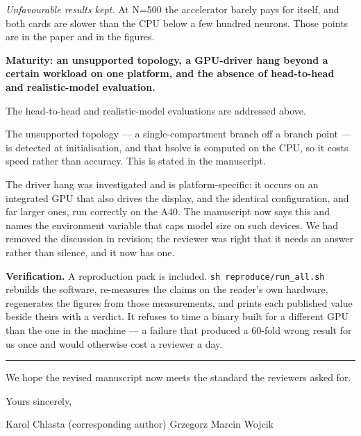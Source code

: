 \documentclass[11pt,a4paper]{article}
\begin{document}
\emph{Unfavourable results kept.} At N=500 the accelerator barely pays for itself, and both cards are slower than the CPU below a few hundred neurons. Those points are in the paper and in the figures.

\textbf{Maturity: an unsupported topology, a GPU-driver hang beyond a certain workload on one platform, and the absence of head-to-head and realistic-model evaluation.}

The head-to-head and realistic-model evaluations are addressed above.

The unsupported topology --- a single-compartment branch off a branch point --- is detected at initialisation, and that hsolve is computed on the CPU, so it costs speed rather than accuracy. This is stated in the manuscript.

The driver hang was investigated and is platform-specific: it occurs on an integrated GPU that also drives the display, and the identical configuration, and far larger ones, run correctly on the A40. The manuscript now says this and names the environment variable that caps model size on such devices. We had removed the discussion in revision; the reviewer was right that it needs an answer rather than silence, and it now has one.

\textbf{Verification.} A reproduction pack is included. \texttt{sh reproduce/run\_all.sh} rebuilds the software, re-measures the claims on the reader's own hardware, regenerates the figures from those measurements, and prints each published value beside theirs with a verdict. It refuses to time a binary built for a different GPU than the one in the machine --- a failure that produced a 60-fold wrong result for us once and would otherwise cost a reviewer a day.

\medskip\hrule\medskip

We hope the revised manuscript now meets the standard the reviewers asked for.

Yours sincerely,

Karol Chlasta (corresponding author) Grzegorz Marcin Wojcik
\end{document}
